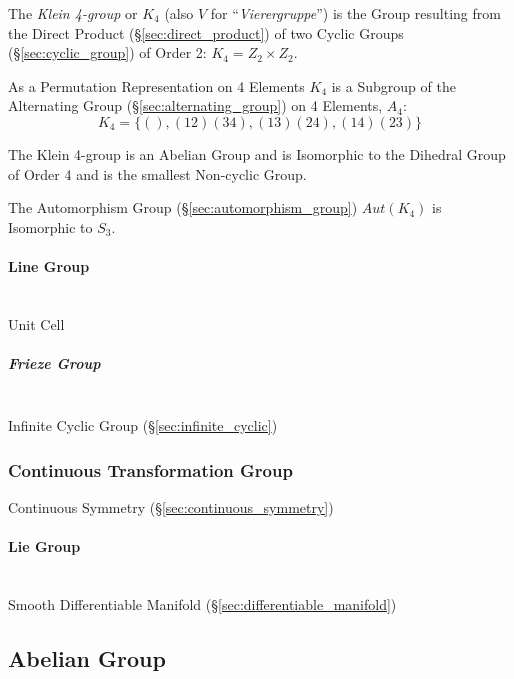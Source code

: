 The \emph{Klein 4-group} or $K_4$ (also $V$ for
``\emph{Vierergruppe}'') is the Group resulting from the Direct
Product (\S\ref{sec:direct_product}) of two Cyclic Groups
(\S\ref{sec:cyclic_group}) of Order 2: $K_4 = Z_2 \times Z_2$.

As a Permutation Representation on 4 Elements $K_4$ is a Subgroup of
the Alternating Group (\S\ref{sec:alternating_group}) on 4 Elements,
$A_4$:
\[
    K_4 = \{ (), (12)(34), (13)(24), (14)(23) \}
\]

The Klein 4-group is an Abelian Group and is Isomorphic to the
Dihedral Group of Order 4 and is the smallest Non-cyclic Group.

The Automorphism Group (\S\ref{sec:automorphism_group}) $Aut(K_4)$ is
Isomorphic to $S_3$.



\paragraph{Line Group}\label{sec:line_group}
\hfill \\

Unit Cell



\subparagraph{Frieze Group}\label{sec:frieze_group}
\hfill \\

Infinite Cyclic Group (\S\ref{sec:infinite_cyclic})



\subsubsection{Continuous Transformation Group}
\label{sec:continuous_transformation_group}

Continuous Symmetry (\S\ref{sec:continuous_symmetry})



\paragraph{Lie Group}\label{sec:lie_group}
\hfill \\

Smooth Differentiable Manifold (\S\ref{sec:differentiable_manifold})



\subsection{Abelian Group}\label{sec:abelian_group}

